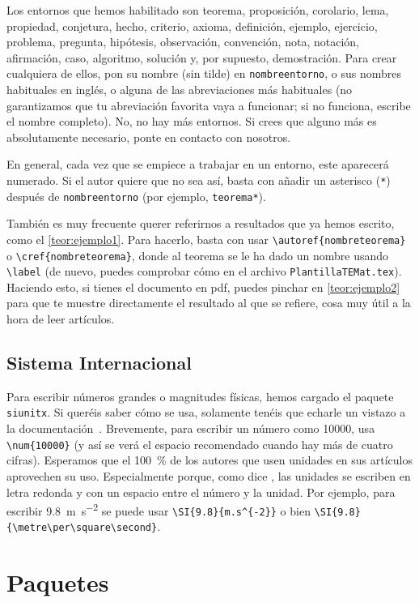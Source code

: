 \documentclass[%
extracommands,%
]{revistaanem}
\begin{document}
Los entornos que hemos habilitado son teorema, proposición, corolario, lema, propiedad, conjetura, hecho, criterio, axioma, definición, ejemplo, ejercicio, problema, pregunta, hipótesis, observación, convención, nota, notación, afirmación, caso, algoritmo, solución y, por supuesto, demostración.
Para crear cualquiera de ellos, pon su nombre (sin tilde) en \verb+nombreentorno+, o sus nombres habituales en inglés, o alguna de las abreviaciones más habituales (no garantizamos que tu abreviación favorita vaya a funcionar; si no funciona, escribe el nombre completo).
No, no hay más entornos.
Si crees que alguno más es absolutamente necesario, ponte en contacto con nosotros.

En general, cada vez que se empiece a trabajar en un entorno, este aparecerá numerado.
Si el autor quiere que no sea así, basta con añadir un asterisco (\verb+*+) después de \verb+nombreentorno+ (por ejemplo, \verb+teorema*+).

También es muy frecuente querer referirnos a resultados que ya hemos escrito, como el \autoref{teor:ejemplo1}. Para hacerlo, basta con usar \verb+\autoref{nombreteorema}+ o \verb+\cref{nombreteorema}+, donde al teorema se le ha dado un nombre usando \verb+\label+ (de nuevo, puedes comprobar cómo en el archivo \verb+PlantillaTEMat.tex+).
Haciendo esto, si tienes el documento en pdf, puedes pinchar en \autoref{teor:ejemplo2} para que te muestre directamente el resultado al que se refiere, cosa muy útil a la hora de leer artículos.

\subsection{Sistema Internacional}

Para escribir números grandes o magnitudes físicas, hemos cargado el paquete \verb+siunitx+.
Si queréis saber cómo se usa, solamente tenéis que echarle un vistazo a la documentación~\cite{siunitx}.
Brevemente, para escribir un número como \num{10000}, usa \verb+\num{10000}+ (y así se verá el espacio recomendado cuando hay más de cuatro cifras).
Esperamos que el \SI{100}{\percent} de los autores que usen unidades en sus artículos aprovechen su uso.
Especialmente porque, como dice \citet{bezosOM}, las unidades se escriben en letra redonda y con un espacio entre el número y la unidad.
Por ejemplo, para escribir \SI{9.8}{m.s^{-2}} se puede usar \verb+\SI{9.8}{m.s^{-2}}+ o bien \verb+\SI{9.8}{\metre\per\square\second}+.

\section{Paquetes}
\end{document}
